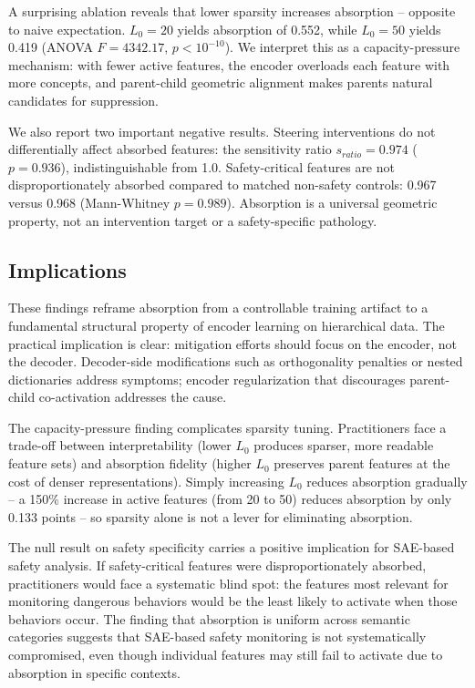 \documentclass{article}
\begin{document}
A surprising ablation reveals that lower sparsity increases absorption -- opposite to naive expectation. $L_0 = 20$ yields absorption of 0.552, while $L_0 = 50$ yields 0.419 (ANOVA $F = 4342.17$, $p < 10^{-10}$). We interpret this as a capacity-pressure mechanism: with fewer active features, the encoder overloads each feature with more concepts, and parent-child geometric alignment makes parents natural candidates for suppression.

We also report two important negative results. Steering interventions do not differentially affect absorbed features: the sensitivity ratio $s_{ratio} = 0.974$ ($p = 0.936$), indistinguishable from 1.0. Safety-critical features are not disproportionately absorbed compared to matched non-safety controls: 0.967 versus 0.968 (Mann-Whitney $p = 0.989$). Absorption is a universal geometric property, not an intervention target or a safety-specific pathology.

\subsection{Implications}

These findings reframe absorption from a controllable training artifact to a fundamental structural property of encoder learning on hierarchical data. The practical implication is clear: mitigation efforts should focus on the encoder, not the decoder. Decoder-side modifications such as orthogonality penalties \citep{korznikov2025} or nested dictionaries \citep{bussmann2025} address symptoms; encoder regularization that discourages parent-child co-activation addresses the cause.

The capacity-pressure finding complicates sparsity tuning. Practitioners face a trade-off between interpretability (lower $L_0$ produces sparser, more readable feature sets) and absorption fidelity (higher $L_0$ preserves parent features at the cost of denser representations). Simply increasing $L_0$ reduces absorption gradually -- a 150\% increase in active features (from 20 to 50) reduces absorption by only 0.133 points -- so sparsity alone is not a lever for eliminating absorption.

The null result on safety specificity carries a positive implication for SAE-based safety analysis. If safety-critical features were disproportionately absorbed, practitioners would face a systematic blind spot: the features most relevant for monitoring dangerous behaviors would be the least likely to activate when those behaviors occur. The finding that absorption is uniform across semantic categories suggests that SAE-based safety monitoring is not systematically compromised, even though individual features may still fail to activate due to absorption in specific contexts.
\end{document}
